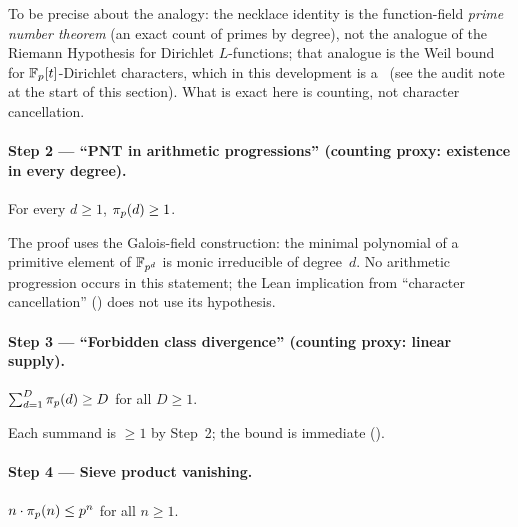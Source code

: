 To be precise about the analogy: the necklace identity is the
function-field \emph{prime number theorem} (an exact count of primes by
degree), not the analogue of the Riemann Hypothesis for Dirichlet
$L$-functions; that analogue is the Weil bound for $\mathbb{F}_p[t]$-Dirichlet
characters, which in this development is a \placeholder\ (see the audit note at the start of this section).
What is exact here is counting, not character cancellation.

\paragraph{Step 2 --- ``PNT in arithmetic progressions'' (counting proxy:
existence in every degree).}
\begin{theorem}
For every $d \geq 1$, $\pi_p(d) \geq 1$.
\end{theorem}

The proof uses the Galois-field construction: the minimal polynomial of
a primitive element of $\mathbb{F}_{p^{d}}$ is monic irreducible of degree~$d$.
No arithmetic progression occurs in this statement; the Lean
implication from ``character cancellation''
()
does not use its hypothesis.

\paragraph{Step 3 --- ``Forbidden class divergence'' (counting proxy:
linear supply).}
\begin{property}
$\sum_{d=1}^{D}\pi_p(d) \geq D$ for all $D \geq 1$.
\end{property}

\begin{theorem}
Each summand is $\geq 1$ by Step~2; the bound is immediate
().
\end{theorem}

\paragraph{Step 4 --- Sieve product vanishing.}
\begin{property}
$n\cdot\pi_p(n) \leq p^n$ for all $n \geq 1$.
\end{property}

